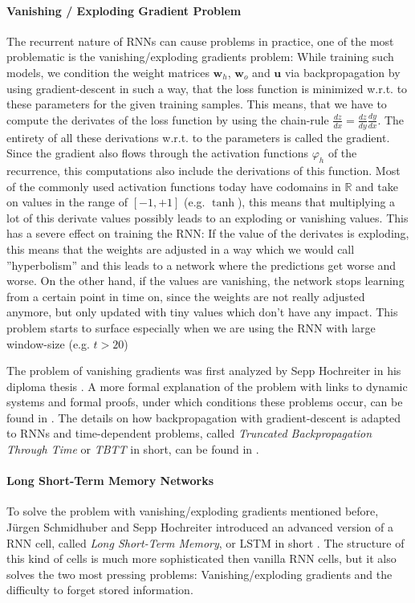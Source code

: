 \paragraph{Vanishing / Exploding Gradient Problem} The recurrent nature of RNNs can cause problems in practice, one of the most problematic is the vanishing/exploding gradients problem: While training such models, we condition the weight matrices $\mathbf{w}_h$, $\mathbf{w}_o$ and $\mathbf{u}$ via backpropagation by using gradient-descent in such a way, that the loss function is minimized w.r.t. to these parameters for the given training samples. This means, that we have to compute the derivates of the loss function by using the chain-rule $\frac{dz}{dx} = \frac{dz}{dy}\frac{dy}{dx}$. The entirety of all these derivations w.r.t. to the parameters is called the gradient. Since the gradient also flows through the activation functions $\varphi_h$ of the recurrence, this computations also include the derivations of this function. Most of the commonly used activation functions today have codomains in $\mathbb{R}$ and take on values in the range of $[-1, +1]$ (e.g. $\operatorname{tanh}$), this means that multiplying a lot of this derivate values possibly leads to an exploding or vanishing values. This has a severe effect on training the RNN: If the value of the derivates is exploding, this means that the weights are adjusted in a way which we would call ''hyperbolism'' and this leads to a network where the predictions get worse and worse. On the other hand, if the values are vanishing, the network stops learning from a certain point in time on, since the weights are not really adjusted anymore, but only updated with tiny values which don't have any impact. This problem starts to surface especially when we are using the RNN with large window-size (e.g. $t > 20$)

The problem of vanishing gradients was first analyzed by Sepp Hochreiter in his diploma thesis \cite{Hochreiter:1991}. A more formal explanation of the problem with links to dynamic systems and formal proofs, under which conditions these problems occur, can be found in \cite{Pascanu:2013}. The details on how backpropagation with gradient-descent is adapted to RNNs and time-dependent problems, called \emph{Truncated Backpropagation Through Time} or \emph{TBTT} in short, can be found in \cite{Werbos:1990}.

\paragraph{Long Short-Term Memory Networks} To solve the problem with vanishing/exploding gradients mentioned before, J\"urgen Schmidhuber and Sepp Hochreiter introduced an advanced version of a RNN cell, called \emph{Long Short-Term Memory}, or LSTM in short \cite{Hochreiter:1997}. The structure of this kind of cells is much more sophisticated then vanilla RNN cells, but it also solves the two most pressing problems: Vanishing/exploding gradients and the difficulty to forget stored information.

